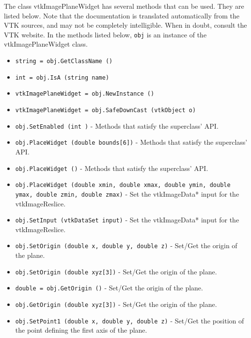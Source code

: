The class vtkImagePlaneWidget has several methods that can be used.
  They are listed below.
Note that the documentation is translated automatically from the VTK sources,
and may not be completely intelligible.  When in doubt, consult the VTK website.
In the methods listed below, \verb|obj| is an instance of the vtkImagePlaneWidget class.
\begin{itemize}
\item  \verb|string = obj.GetClassName ()|

\item  \verb|int = obj.IsA (string name)|

\item  \verb|vtkImagePlaneWidget = obj.NewInstance ()|

\item  \verb|vtkImagePlaneWidget = obj.SafeDownCast (vtkObject o)|

\item  \verb|obj.SetEnabled (int )| -  Methods that satisfy the superclass' API.

\item  \verb|obj.PlaceWidget (double bounds[6])| -  Methods that satisfy the superclass' API.

\item  \verb|obj.PlaceWidget ()| -  Methods that satisfy the superclass' API.

\item  \verb|obj.PlaceWidget (double xmin, double xmax, double ymin, double ymax, double zmin, double zmax)| -  Set the vtkImageData* input for the vtkImageReslice.

\item  \verb|obj.SetInput (vtkDataSet input)| -  Set the vtkImageData* input for the vtkImageReslice.

\item  \verb|obj.SetOrigin (double x, double y, double z)| -  Set/Get the origin of the plane.

\item  \verb|obj.SetOrigin (double xyz[3])| -  Set/Get the origin of the plane.

\item  \verb|double = obj.GetOrigin ()| -  Set/Get the origin of the plane.

\item  \verb|obj.GetOrigin (double xyz[3])| -  Set/Get the origin of the plane.

\item  \verb|obj.SetPoint1 (double x, double y, double z)| -  Set/Get the position of the point defining the first axis of the plane.


\end{itemize}
